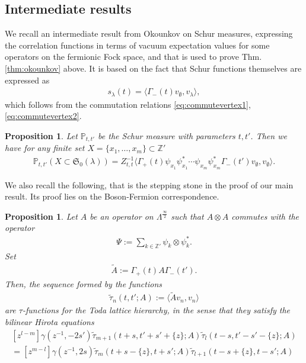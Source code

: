 \documentclass[12pt]{amsart}
\newtheorem{prop}[thm]{Proposition}
\theoremstyle{definition}
\renewcommand{\P}{\mathbb{P}}
\newcommand{\Z}{\mathbb{Z}}
\begin{document}
\subsection{Intermediate results}

We recall an intermediate result from Okounkov on Schur measures, expressing the correlation functions in terms of vacuum expectation values for some operators on the fermionic Fock space, and that is used to prove Thm. \ref{thm:okounkov} above. It is based on the fact that Schur functions themselves are expressed as
\begin{align*}
    s_\lambda(t)=\langle \Gamma_-(t) v_\emptyset,v_\lambda\rangle,
\end{align*}
which follows from the commutation relations \eqref{eq:commutevertex1}, \eqref{eq:commutevertex2}.
\begin{prop} \label{prop:schurpsi} Let $\P_{t,t'}$ be the Schur measure with parameters $t,t'$. Then we have for any finite set $X=\{x_1,\dots, x_m \} \subset \Z'$
\begin{align*}
\P_{t,t'} ( X \subset \mathfrak{S}_0(\lambda) )= Z_{t,t}^{-1} \langle \Gamma_+(t) \psi_{x_1} \psi_{x_1}^* \cdots \psi_{x_m} \psi_{x_m}^* \Gamma_-(t') v_{\emptyset} , v_{\emptyset} \rangle .
\end{align*}
\end{prop}
We also recall the following, that is the stepping stone in the proof of our main result. Its proof lies on the Boson-Fermion correspondence.
\begin{prop} \label{prop:schurtau} Let $A$ be an operator on $\Lambda^{ \frac{\infty}{2}}$ such that $A \otimes A$ commutes with the operator
\begin{align} \label{eq:defPsi}
\Psi := \sum_{ k \in \Z'} \psi_k \otimes \psi_k^*.
\end{align}
Set
\begin{align*}
\tilde{A}:= \Gamma_+(t) A \Gamma_-(t').
\end{align*}
Then, the sequence formed by the functions
\begin{align*}
 \tilde{\tau}_n(t,t'; A):=\langle \tilde{A} v_n, v_n \rangle
\end{align*}
are $\tau$-functions for the Toda lattice hierarchy, in the sense that they satisfy the bilinear Hirota equations
\begin{multline} \label{eq:hirotagene}
[z^{l-m}]\gamma(z^{-1},-2s')\tilde{\tau}_{m+1}(t+s,t'+s'+\{z\};A) \tilde{\tau}_l(t-s,t'-s'-\{z\} ; A ) \\
=[z^{m-l}] \gamma(z^{-1},2s) \tilde{\tau}_m (t+s -\{z\} , t +s' ; A) \tilde{\tau}_{l+1}(t-s+ \{z \}, t-s'; A )
\end{multline}
\end{prop}
\end{document}
